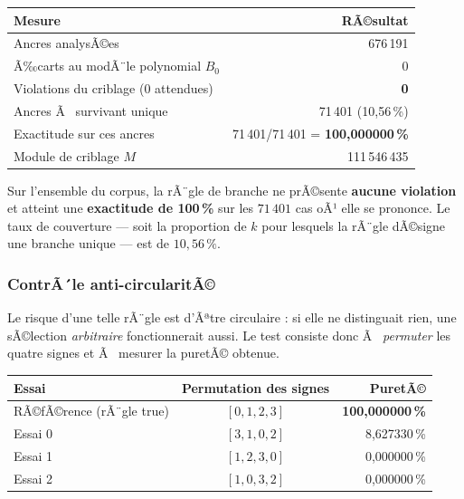\begin{center}
\small
\begin{tabular}{@{}l r@{}}
\toprule
\rowcolor{spectralgris}
Mesure & RÃ©sultat \\
\midrule
Ancres analysÃ©es & 676\,191 \\
Ã‰carts au modÃ¨le polynomial $B_0$ & 0 \\
Violations du criblage (0 attendues) & \textbf{0} \\
Ancres Ã  survivant unique & 71\,401 \quad (10{,}56\,\%) \\
Exactitude sur ces ancres & 71\,401/71\,401 \;=\; \textbf{100{,}000000\,\%} \\
Module de criblage $M$ & 111\,546\,435 \\
\bottomrule
\end{tabular}
\end{center}

\begin{boiteformule}
Sur l'ensemble du corpus, la rÃ¨gle de branche ne prÃ©sente
\textbf{aucune violation} et atteint une \textbf{exactitude de
100\,\%} sur les $71\,401$ cas oÃ¹ elle se prononce. Le taux de
couverture --- soit la proportion de $k$ pour lesquels la rÃ¨gle dÃ©signe
une branche unique --- est de $10{,}56\,\%$.
\end{boiteformule}

\subsubsection{ContrÃ´le anti-circularitÃ©}

Le risque d'une telle rÃ¨gle est d'Ãªtre circulaire : si elle ne
distinguait rien, une sÃ©lection \emph{arbitraire} fonctionnerait aussi.
Le test consiste donc Ã  \emph{permuter} les quatre signes et Ã  mesurer
la puretÃ© obtenue.

\begin{center}
\small
\begin{tabular}{@{}l c r@{}}
\toprule
\rowcolor{spectralgris}
Essai & Permutation des signes & PuretÃ© \\
\midrule
RÃ©fÃ©rence (rÃ¨gle true) & $[0,1,2,3]$ & \textbf{100{,}000000\,\%} \\
Essai 0 & $[3,1,0,2]$ & 8{,}627330\,\% \\
Essai 1 & $[1,2,3,0]$ & 0{,}000000\,\% \\
Essai 2 & $[1,0,3,2]$ & 0{,}000000\,\% \\
\bottomrule
\end{tabular}
\end{center}


